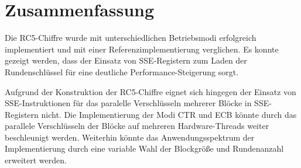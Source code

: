 \documentclass[course=erap]{aspdoc}
\begin{document}
\section{Zusammenfassung}

Die RC5-Chiffre wurde mit unterschiedlichen Betriebsmodi erfolgreich implementiert und mit einer Referenzimplementierung verglichen. Es konnte gezeigt werden, dass der Einsatz von SSE-Registern zum Laden der Rundenschlüssel für eine deutliche Performance-Steigerung sorgt.\bigbreak

Aufgrund der Konstruktion der RC5-Chiffre eignet sich hingegen der Einsatz von SSE-Instruktionen für das paralelle Verschlüsseln mehrerer Blöcke in SSE-Registern nicht. Die Implementierung der Modi CTR und ECB könnte durch das parallele Verschlüsseln der Blöcke auf mehreren Hardware-Threads weiter beschleunigt werden. Weiterhin könnte das Anwendungsspektrum der Implementierung durch eine variable Wahl der Blockgröße und Rundenanzahl erweitert werden.

\newpage
{\renewcommand{\markboth}[2]{}
\printbibliography}
\end{document}
